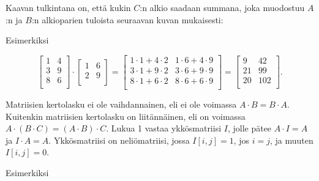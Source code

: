 Kaavan tulkintana on, että kukin $C$:n alkio
saadaan summana, joka muodostuu $A$:n ja
$B$:n alkioparien tuloista seuraavan
kuvan mukaisesti:

\begin{center}
\end{center}

Esimerkiksi

\[
 \begin{bmatrix}
  1 & 4 \\
  3 & 9 \\
  8 & 6 \\
 \end{bmatrix}
\cdot
 \begin{bmatrix}
  1 & 6 \\
  2 & 9 \\
 \end{bmatrix}
=
 \begin{bmatrix}
  1 \cdot 1 + 4 \cdot 2 & 1 \cdot 6 + 4 \cdot 9 \\
  3 \cdot 1 + 9 \cdot 2 & 3 \cdot 6 + 9 \cdot 9 \\
  8 \cdot 1 + 6 \cdot 2 & 8 \cdot 6 + 6 \cdot 9 \\
 \end{bmatrix}
=
 \begin{bmatrix}
  9 & 42 \\
  21 & 99 \\
  20 & 102 \\
 \end{bmatrix}.
\]

Matriisien kertolasku ei ole vaihdannainen,
eli ei ole voimassa $A \cdot B = B \cdot A$.
Kuitenkin matriisien kertolasku
on liitännäinen, eli on voimassa $A \cdot (B \cdot C)=(A \cdot B) \cdot C$.
Lukua 1 vastaa ykkösmatriisi $I$,
jolle pätee $A \cdot I = A$ ja $I \cdot A = A$.
Ykkösmatriisi on neliömatriisi, jossa $I[i,j]=1$,
jos $i=j$, ja muuten $I[i,j]=0$.

Esimerkiksi

